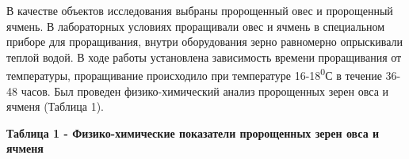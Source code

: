 \begin{multicols}{2}
В качестве объектов исследования выбраны пророщенный овес и пророщенный
ячмень. В лабораторных условиях проращивали овес и ячмень в специальном
приборе для проращивания, внутри оборудования зерно равномерно
опрыскивали теплой водой. В ходе работы установлена зависимость времени
проращивания от температуры, проращивание происходило при температуре
16-18\textsuperscript{0}С в течение 36-48 часов. Был проведен
физико-химический анализ пророщенных зерен овса и ячменя (Таблица 1).
\end{multicols}

{\bfseries Таблица 1 - Физико-химические показатели пророщенных зерен овса и ячменя}

